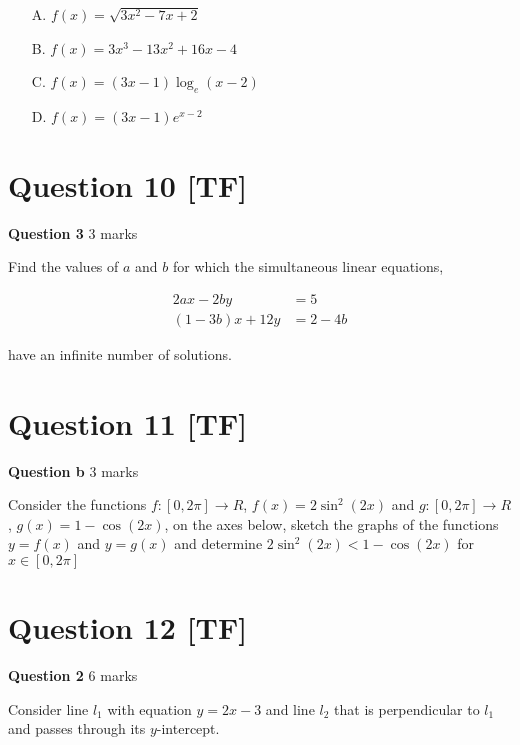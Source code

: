 \documentclass[12pt,a4paper]{article}
\begin{document}
\begin{enumerate}
    \item[A.] $f(x) = \sqrt{3x^2 - 7x + 2}$
    \item[B.] $f(x) = 3x^3 - 13x^2 + 16x - 4$
    \item[C.] $f(x) = (3x - 1)\log_e(x - 2)$
    \item[D.] $f(x) = (3x - 1)e^{x-2}$
\end{enumerate}

\vspace{5\baselineskip}

\hrulefill

\section*{Question 10 [TF]}

\textbf{Question 3} \hfill 3 marks

Find the values of $a$ and $b$ for which the simultaneous linear equations,

\begin{align*}
2ax - 2by &= 5\\
(1-3b)x + 12y &= 2 - 4b
\end{align*}

have an infinite number of solutions.

\vspace{5\baselineskip}

\section*{Question 11 [TF]}

\textbf{Question b} \hfill 3 marks

Consider the functions $f : [0,2\pi] \to R$, $f(x) = 2\sin^2(2x)$ and $g : [0,2\pi] \to R$, $g(x) = 1 - \cos(2x)$, on the axes below, sketch the graphs of the functions $y = f(x)$ and $y = g(x)$ and determine $2\sin^2(2x) < 1 - \cos(2x)$ for $x \in [0,2\pi]$

\vspace{5\baselineskip}

\hrulefill

\section*{Question 12 [TF]}

\textbf{Question 2} \hfill 6 marks

Consider line $l_1$ with equation $y = 2x - 3$ and line $l_2$ that is perpendicular to $l_1$ and passes through its $y$-intercept.
\end{document}
